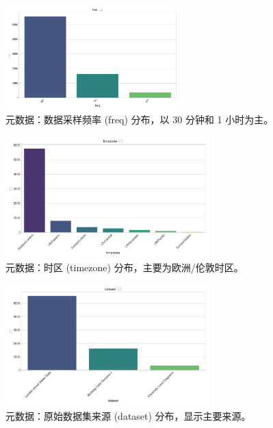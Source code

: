 \documentclass{article} %
\begin{document}
\begin{figure}[H]
    \centering
    \includegraphics[width=0.6\textwidth]{../plots/metadata_dist_freq.png}
    \caption{元数据：数据采样频率 (freq) 分布，以 30 分钟和 1 小时为主。} %
    \label{fig:metadata_dist_freq}
\end{figure}

\begin{figure}[H]
    \centering
    \includegraphics[width=0.7\textwidth]{../plots/metadata_dist_timezone.png}
    \caption{元数据：时区 (timezone) 分布，主要为欧洲/伦敦时区。} %
    \label{fig:metadata_dist_timezone}
\end{figure}

\begin{figure}[H]
    \centering
    \includegraphics[width=0.7\textwidth]{../plots/metadata_dist_dataset.png}
    \caption{元数据：原始数据集来源 (dataset) 分布，显示主要来源。} %
    \label{fig:metadata_dist_dataset}
\end{figure}
\end{document}

